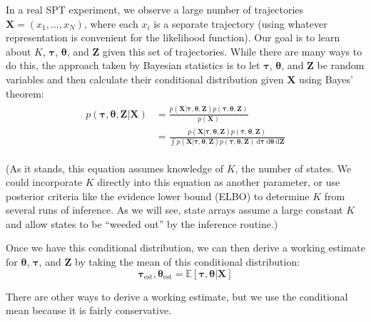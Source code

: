 \documentclass{article}
\renewcommand{\vec}{\mathbf}
\newcommand{\D}{\text{d}}
\begin{document}
In a real SPT experiment, we observe a large number of trajectories
$\vec{X} = (x_{1}, ..., x_{N})$, where each $x_{i}$ is a separate trajectory (using
whatever representation is convenient for the likelihood function). 
Our goal is to learn about $K$, $\boldsymbol{\tau}$,
$\boldsymbol{\theta}$, and $\vec{Z}$ given this set of trajectories. While there are many ways to do this,
the approach taken by Bayesian statistics is to let $\boldsymbol{\tau}$, $\boldsymbol{\theta}$,
and $\vec{Z}$ be random variables and then calculate their conditional distribution given $\vec{X}$ using
Bayes' theorem:
\begin{align}\begin{split}\label{eq:bayes_theorem}
	p \left( \boldsymbol{\tau}, \boldsymbol{\theta}, \vec{Z} | \vec{X} \right) &= \frac{
		p \left( \vec{X} | \boldsymbol{\tau}, \boldsymbol{\theta}, \vec{Z} \right) p \left( \boldsymbol{\tau}, \boldsymbol{\theta}, \vec{Z} \right)
	}{
		p \left( \vec{X} \right)
	} \\
	&= \frac{
		p \left( \vec{X} | \boldsymbol{\tau}, \boldsymbol{\theta}, \vec{Z} \right) p \left( \boldsymbol{\tau}, \boldsymbol{\theta}, \vec{Z} \right)
	}{
		\int p \left( \vec{X} | \boldsymbol{\tau}, \boldsymbol{\theta}, \vec{Z} \right) p \left( \boldsymbol{\tau}, \boldsymbol{\theta}, \vec{Z} \right) \: \D \boldsymbol{\tau} \: \D \boldsymbol{\theta} \: \D \vec{Z} 
	}
\end{split}\end{align}

(As it stands, this equation assumes knowledge of $K$, the number of states. We could 
incorporate $K$ directly into this equation as another parameter, or use posterior criteria like the evidence
lower bound (ELBO) to determine $K$ from several runs of inference. As we will see, 
state arrays assume a large constant $K$ and allow states to be ``weeded out'' by 
the inference routine.) \newline

Once we have this conditional distribution, we can then derive a working estimate for 
$\boldsymbol{\theta}$, $\boldsymbol{\tau}$, and $\vec{Z}$ by taking the mean of this conditional 
distribution:
\[
	\boldsymbol{\tau}_{\text{est}}, \boldsymbol{\theta}_{\text{est}} = \mathbb{E} \left[ \boldsymbol{\tau}, \boldsymbol{\theta} | \vec{X} \right]
\]

There are other ways to derive a working estimate, but we use the conditional mean
because it is fairly conservative. \newline
\end{document}
